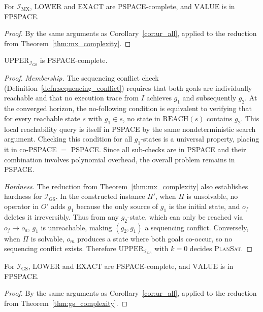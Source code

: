 \begin{cor}
    \label{cor:mx_all}
    For $\mathcal{I}_{\text{MX}}$, $\text{LOWER}$ and $\text{EXACT}$ are PSPACE-complete, and $\text{VALUE}$ is in FPSPACE.
\end{cor}
\begin{proof}
    By the same arguments as Corollary~\ref{cor:ur_all}, applied to the reduction from Theorem~\ref{thm:mx_complexity}.
\end{proof}
\pagebreak
\begin{thm}
    \label{thm:gs_complexity}
    $\text{UPPER}_{\mathcal{I}_{\text{GS}}}$ is PSPACE-complete.
\end{thm}
\begin{proof}
    \emph{Membership.} The sequencing conflict check (Definition~\ref{defn:sequencing_conflict}) requires that both goals are individually reachable and that no execution trace from $I$ achieves $g_1$ and subsequently $g_2$. At the converged horizon, the no-following condition is equivalent to verifying that for every reachable state $s$ with $g_1 \in s$, no state in $\text{REACH}(s)$ contains $g_2$. This local reachability query is itself in PSPACE by the same nondeterministic search argument. Checking this condition for all $g_1$-states is a universal property, placing it in co-PSPACE $=$ PSPACE. Since all sub-checks are in PSPACE and their combination involves polynomial overhead, the overall problem remains in PSPACE.

    \emph{Hardness.} The reduction from Theorem~\ref{thm:mx_complexity} also establishes hardness for $\mathcal{I}_{\text{GS}}$. In the constructed instance $\Pi'$, when $\Pi$ is unsolvable, no operator in $O'$ adds $g_1$ because the only source of $g_1$ is the initial state, and $o_f$ deletes it irreversibly. Thus from any $g_2$-state, which can only be reached via $o_f \to o_a$, $g_1$ is unreachable, making $(g_2, g_1)$ a sequencing conflict. Conversely, when $\Pi$ is solvable, $o_m$ produces a state where both goals co-occur, so no sequencing conflict exists. Therefore $\text{UPPER}_{\mathcal{I}_{\text{GS}}}$ with $k = 0$ decides \textsc{PlanSat}.
\end{proof}

\begin{cor}
    \label{cor:gs_all}
    For $\mathcal{I}_{\text{GS}}$, $\text{LOWER}$ and $\text{EXACT}$ are PSPACE-complete, and $\text{VALUE}$ is in FPSPACE.
\end{cor}
\begin{proof}
    By the same arguments as Corollary~\ref{cor:ur_all}, applied to the reduction from Theorem~\ref{thm:gs_complexity}.
\end{proof}

